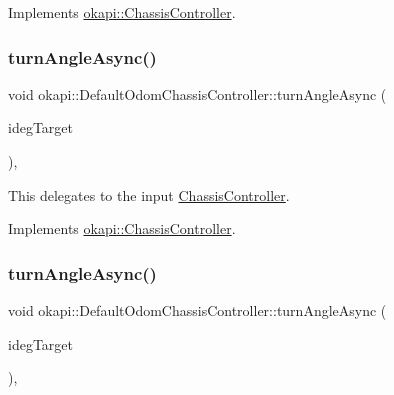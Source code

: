 Implements \mbox{\hyperlink{classokapi_1_1ChassisController_a6aca227e35ececd02eed1cc42d09ad1d}{okapi\+::\+Chassis\+Controller}}.

\mbox{\label{classokapi_1_1DefaultOdomChassisController_a18d748097a7938e3102638d17be54c76}} 
\subsubsection{\texorpdfstring{turnAngleAsync()}{turnAngleAsync()}\hspace{0.1cm}{\footnotesize\ttfamily [1/2]}}
{\footnotesize\ttfamily void okapi\+::\+Default\+Odom\+Chassis\+Controller\+::turn\+Angle\+Async (\begin{DoxyParamCaption}\item[{Q\+Angle}]{ideg\+Target }\end{DoxyParamCaption})\hspace{0.3cm}{\ttfamily [override]}, {\ttfamily [virtual]}}

This delegates to the input \mbox{\hyperlink{classokapi_1_1ChassisController}{Chassis\+Controller}}. 

Implements \mbox{\hyperlink{classokapi_1_1ChassisController_a87fc1f88bf06340d8f022a8c185b5e87}{okapi\+::\+Chassis\+Controller}}.

\mbox{\label{classokapi_1_1DefaultOdomChassisController_a948978204fc6f2a2443025dfdb0241b1}} 
\subsubsection{\texorpdfstring{turnAngleAsync()}{turnAngleAsync()}\hspace{0.1cm}{\footnotesize\ttfamily [2/2]}}
{\footnotesize\ttfamily void okapi\+::\+Default\+Odom\+Chassis\+Controller\+::turn\+Angle\+Async (\begin{DoxyParamCaption}\item[{double}]{ideg\+Target }\end{DoxyParamCaption})\hspace{0.3cm}{\ttfamily [override]}, {\ttfamily [virtual]}}

